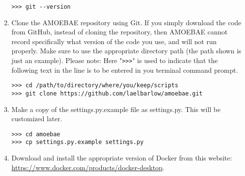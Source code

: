 \documentclass[12pt,letterpaper]{article}
\begin{document}
\begin{linenumbers}
\begin{enumerate}
\begin{lstlisting}
>>> git --version
\end{lstlisting}

\item Clone the AMOEBAE repository using Git. If you simply download the code
    from GitHub, instead of cloning the repository, then AMOEBAE cannot record
        specifically what version of the code you use, and will not run
        properly. Make sure to use the appropriate directory path (the path
        shown is just an example).  Please note: Here "\texttt{>{}>{}>}" is
        used to indicate that the following text in the line is to be entered
        in you terminal command prompt.

\begin{lstlisting}
>>> cd /path/to/directory/where/you/keep/scripts
>>> git clone https://github.com/laelbarlow/amoebae.git
\end{lstlisting}


%



\item Make a copy of the settings.py.example file as settings.py. This will be
    customized later. 

\begin{lstlisting}
>>> cd amoebae
>>> cp settings.py.example settings.py
\end{lstlisting}


\item Download and install the appropriate version of Docker from this website:
    \url{https://www.docker.com/products/docker-desktop}.



\end{enumerate}
\end{linenumbers}
\end{document}
